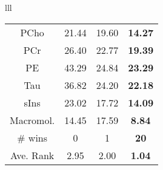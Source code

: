 \documentclass{llncs}
\begin{document}
\begin{table*}
\begin{center}
\begin{tabular}{lll}
\begin{tabular}{c c c c}
PCho     & 21.44  	& 19.60 	& \bf 14.27 	\\
PCr      & 26.40  	& 22.77 	& \bf 19.39 	\\
PE       & 43.29  	& 24.84 	& \bf 23.29 	\\
Tau      & 36.82  	& 24.20 	& \bf 22.18 	\\
sIns     & 23.02  	& 17.72 	& \bf 14.09 	\\
\hdashline      
Macromol.& 14.45  	& 17.59 	& \bf 8.84 	\\[2pt]
\hline
\# wins   & 0           &  1            & \bf 20 \\
Ave. Rank & 2.95        & 2.00          & \bf 1.04 \\ %

\hline
\end{tabular}
\end{tabular}
\end{center}
\end{table*}


\end{document}
